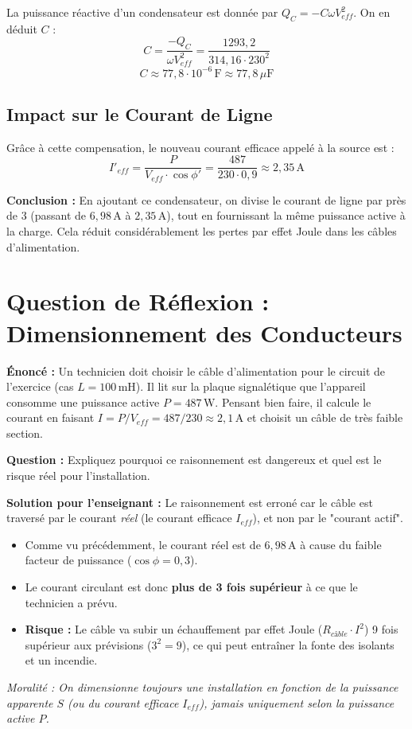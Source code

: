 \documentclass[12pt]{article}
\begin{document}
La puissance réactive d'un condensateur est donnée par $Q_C = -C\omega V_{eff}^2$. On en déduit $C$ :
\[ C = \frac{-Q_C}{\omega V_{eff}^2} = \frac{1293,2}{314,16 \cdot 230^2} \]
\[ C \approx 77,8 \cdot 10^{-6} \, \text{F} \approx 77,8 \, \mu\text{F} \]

\subsection{Impact sur le Courant de Ligne}
Grâce à cette compensation, le nouveau courant efficace appelé à la source est :
\[ I'_{eff} = \frac{P}{V_{eff} \cdot \cos \phi'} = \frac{487}{230 \cdot 0,9} \approx 2,35 \, \text{A} \]

\textbf{Conclusion :} En ajoutant ce condensateur, on divise le courant de ligne par près de 3 (passant de $6,98 \, \text{A}$ à $2,35 \, \text{A}$), tout en fournissant la même puissance active à la charge. Cela réduit considérablement les pertes par effet Joule dans les câbles d'alimentation.

\section{Question de Réflexion : Dimensionnement des Conducteurs}

\textbf{Énoncé :} 
Un technicien doit choisir le câble d'alimentation pour le circuit de l'exercice (cas $L = 100 \, \text{mH}$). Il lit sur la plaque signalétique que l'appareil consomme une puissance active $P = 487 \, \text{W}$. 
Pensant bien faire, il calcule le courant en faisant $I = P / V_{eff} = 487 / 230 \approx 2,1 \, \text{A}$ et choisit un câble de très faible section.

\textbf{Question :} 
Expliquez pourquoi ce raisonnement est dangereux et quel est le risque réel pour l'installation.

\textbf{Solution pour l'enseignant :}
Le raisonnement est erroné car le câble est traversé par le courant \textit{réel} (le courant efficace $I_{eff}$), et non par le "courant actif". 
\begin{itemize}
    \item Comme vu précédemment, le courant réel est de $6,98 \, \text{A}$ à cause du faible facteur de puissance ($\cos \phi = 0,3$).
    \item Le courant circulant est donc \textbf{plus de 3 fois supérieur} à ce que le technicien a prévu.
    \item \textbf{Risque :} Le câble va subir un échauffement par effet Joule ($R_{câble} \cdot I^2$) 9 fois supérieur aux prévisions ($3^2 = 9$), ce qui peut entraîner la fonte des isolants et un incendie.
\end{itemize}
\textit{Moralité : On dimensionne toujours une installation en fonction de la puissance apparente $S$ (ou du courant efficace $I_{eff}$), jamais uniquement selon la puissance active $P$.}
\end{document}
